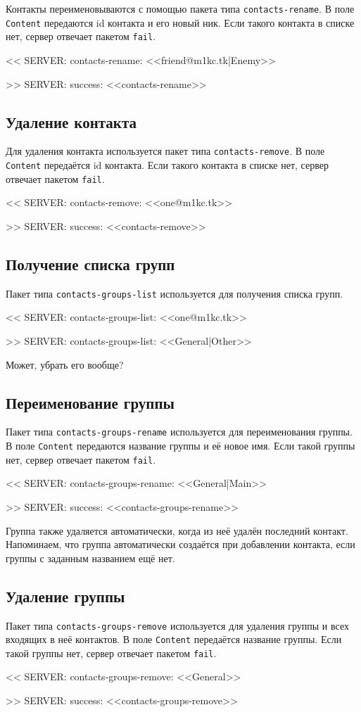 \documentclass[a4paper,12pt]{book}
\begin{document}
Контакты переименовываются с помощью пакета типа \texttt{contacts-rename}. В поле \texttt{Content} передаются id контакта и его новый ник. Если такого контакта в списке нет, сервер отвечает пакетом \texttt{fail}.

{\ttfamily
<{}< SERVER: contacts-rename: <<friend@m1kc.tk|Enemy>>

>{}> SERVER: success: <<contacts-rename>>
}

\subsection{Удаление контакта}

Для удаления контакта используется пакет типа \texttt{contacts-remove}. В поле \texttt{Content} передаётся id контакта. Если такого контакта в списке нет, сервер отвечает пакетом \texttt{fail}.

{\ttfamily
<{}< SERVER: contacts-remove: <<one@m1kc.tk>>

>{}> SERVER: success: <<contacts-remove>>
}

\subsection{Получение списка групп}

Пакет типа \texttt{contacts-groups-list} используется для получения списка групп.

{\ttfamily
<{}< SERVER: contacts-groups-list: <<one@m1kc.tk>>

>{}> SERVER: contacts-groups-list: <<General|Other>>
}

Может, убрать его вообще?

\subsection{Переименование группы}

Пакет типа \texttt{contacts-groups-rename} используется для переименования группы. В поле \texttt{Content} передаются название группы и её новое имя. Если такой группы нет, сервер отвечает пакетом \texttt{fail}.

{\ttfamily
<{}< SERVER: contacts-groups-rename: <<General|Main>>

>{}> SERVER: success: <<contacts-groups-rename>>
}

Группа также удаляется автоматически, когда из неё удалён последний контакт. Напоминаем, что группа автоматически создаётся при добавлении контакта, если группы с заданным названием ещё нет.

\subsection{Удаление группы}

Пакет типа \texttt{contacts-groups-remove} используется для удаления группы и всех входящих в неё контактов. В поле \texttt{Content} передаётся название группы. Если такой группы нет, сервер отвечает пакетом \texttt{fail}.

{\ttfamily
<{}< SERVER: contacts-groups-remove: <<General>>

>{}> SERVER: success: <<contacts-groups-remove>>
}
\end{document}
